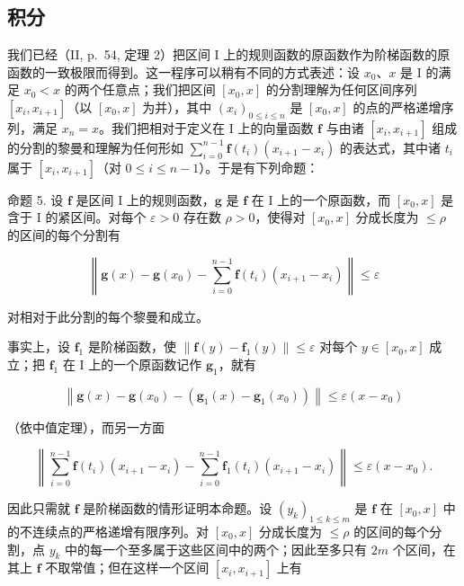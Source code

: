 \subsection{积分}

我们已经（II, p.~54, 定理 2）把区间 I 上的规则函数的原函数作为阶梯函数的原函数的一致极限而得到。这一程序可以稍有不同的方式表述：设 \(x_0\)、\(x\) 是 I 的满足 \(x_0 < x\) 的两个任意点；我们把区间 \([x_0, x]\) 的分割理解为任何区间序列 \([x_i, x_{i+1}]\)（以 \([x_0, x]\) 为并），其中 \((x_i)_{0 \leqslant i \leqslant n}\) 是 \([x_0, x]\) 的点的严格递增序列，满足 \(x_n = x\)。我们把相对于定义在 I 上的向量函数 \(\mathbf{f}\) 与由诸 \([x_i, x_{i+1}]\) 组成的分割的黎曼和理解为任何形如 \(\sum_{i=0}^{n-1} \mathbf{f}(t_i)(x_{i+1} - x_i)\) 的表达式，其中诸 \(t_i\) 属于 \([x_i, x_{i+1}]\)（对 \(0 \leqslant i \leqslant n-1\)）。于是有下列命题：

命题 5. 设 \(\mathbf{f}\) 是区间 I 上的规则函数，\(\mathbf{g}\) 是 \(\mathbf{f}\) 在 I 上的一个原函数，而 \([x_0, x]\) 是含于 I 的紧区间。对每个 \(\varepsilon > 0\) 存在数 \(\rho > 0\)，使得对 \([x_0, x]\) 分成长度为 \(\leqslant \rho\) 的区间的每个分割有

\[
\left\| \mathbf {g} (x) - \mathbf {g} (x _ {0}) - \sum_ {i = 0} ^ {n - 1} \mathbf {f} (t _ {i}) (x _ {i + 1} - x _ {i}) \right\| \leqslant \varepsilon\tag{1}
\]

对相对于此分割的每个黎曼和成立。

事实上，设 \(\mathbf{f}_1\) 是阶梯函数，使 \(\| \mathbf{f}(y) - \mathbf{f}_1(y)\| \leqslant \varepsilon\) 对每个 \(y\in [x_0,x]\) 成立；把 \(\mathbf{f}_1\) 在 I 上的一个原函数记作 \(\mathbf{g}_1\)，就有

\[
\left\| \mathbf {g} (x) - \mathbf {g} \left(x _ {0}\right) - \left(\mathbf {g} _ {1} (x) - \mathbf {g} _ {1} \left(x _ {0}\right)\right) \right\| \leqslant \varepsilon \left(x - x _ {0}\right)
\]

（依中值定理），而另一方面

\[
\left\| \sum_ {i = 0} ^ {n - 1} \mathbf {f} (t _ {i}) (x _ {i + 1} - x _ {i}) - \sum_ {i = 0} ^ {n - 1} \mathbf {f} _ {1} (t _ {i}) (x _ {i + 1} - x _ {i}) \right\| \leqslant \varepsilon (x - x _ {0}).
\]

因此只需就 \(\mathbf{f}\) 是阶梯函数的情形证明本命题。设 \((y_{k})_{1\leqslant k\leqslant m}\) 是 \(\mathbf{f}\) 在 \([x_0, x]\) 中的不连续点的严格递增有限序列。对 \([x_0, x]\) 分成长度为 \(\leqslant \rho\) 的区间的每个分割，点 \(y_{k}\) 中的每一个至多属于这些区间中的两个；因此至多只有 \(2m\) 个区间，在其上 \(\mathbf{f}\) 不取常值；但在这样一个区间 \([x_i, x_{i+1}]\) 上有

